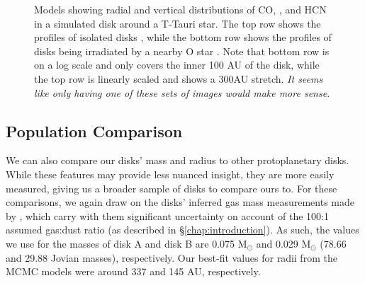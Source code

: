 \begin{figure}[t]
  \hspace*{\fill}%
  \vfill%
  \hspace*{\fill}%
  \caption{Models showing radial and vertical distributions of CO, \hco, and HCN in a simulated disk around a T-Tauri star. The top row shows the profiles of isolated disks \citep{Walsh2010}, while the bottom row shows the profiles of disks being irradiated by a nearby O star \citep{Walsh2013}. Note that bottom row is on a log scale and only covers the inner 100 AU of the disk, while the top row is linearly scaled and shows a 300AU stretch. \textit{It seems like only having one of these sets of images would make more sense.}}
  \label{fig:walsh-abundance-profs}
\end{figure}




\subsection{Population Comparison}

We can also compare our disks' mass and radius to other protoplanetary disks. While these features may provide less nuanced insight, they are more easily measured, giving us a broader sample of disks to compare ours to. For these comparisons, we again draw on the disks' inferred gas mass measurements made by \citet{Williams2014}, which carry with them significant uncertainty on account of the 100:1 assumed gas:dust ratio (as described in \S\ref{chap:introduction}). As such, the values we use for the masses of disk A and disk B are 0.075 M$_\odot$ and 0.029 M$_\odot$ (78.66 and 29.88 Jovian masses), respectively. Our best-fit values for radii from the MCMC models were around 337 and 145 AU, respectively.


